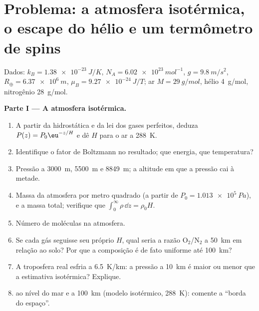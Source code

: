 \section{Problema: a atmosfera isotérmica, o escape do hélio e um termômetro de spins}

\begin{problem}\label{pb:b2:boltzmann-factor:1}
Dados: $k_B = \qty{1.38e-23}{J/K}$, $N_A = \qty{6.02e23}{mol^{-1}}$, $g =
\qty{9.8}{m/s^2}$, $R_{\oplus} = \qty{6.37e6}{m}$, $\mu_B = \qty{9.27e-24}{J/T}$;
ar $M = \qty{29}{g/mol}$, hélio \qty{4}{g/mol}, nitrogênio \qty{28}{g/mol}.

\textbf{Parte I --- A atmosfera isotérmica.}
\begin{enumerate}
  \item A partir da hidrostática e da lei dos gases perfeitos, deduza $P(z) =
        P_0\eu^{-z/H}$ e dê $H$ para o ar a \qty{288}{K}.
  \item Identifique o fator de Boltzmann no resultado; que energia,
        que temperatura?
  \item Pressão a \qty{3000}{m}, \qty{5500}{m} e \qty{8849}{m}; a
        altitude em que a pressão cai à metade.
  \item Massa da atmosfera por metro quadrado (a partir de $P_0 =
        \qty{1.013e5}{Pa}$), e a massa total; verifique que $\int_0^\infty
        \rho\,\dd z = \rho_0H$.
  \item Número de moléculas na atmosfera.
  \item Se cada gás seguisse seu próprio $H$, qual seria a razão
        O$_2$/N$_2$ a \qty{50}{km} em relação ao solo? Por que a
        composição é de fato uniforme até \qty{100}{km}?
  \item A troposfera real esfria a \qty{6.5}{K/km}: a pressão
        a \qty{10}{km} é maior ou menor que a estimativa isotérmica?
        Explique.
  \item {} ao nível do mar e a \qty{100}{km} (modelo
        isotérmico, \qty{288}{K}): comente a ``borda do espaço''.
\end{enumerate}


\end{problem}
